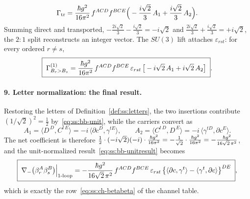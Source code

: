 \begin{equation}\label{eq:ss:bb-trsum}
\Gamma_{\mathrm{tr}}
=\frac{\hbar g^{2}}{16\pi^{2}}\,f^{ACD}f^{BCE}
\Big(-\frac{i\sqrt2}{3}\,A_1+\frac{i\sqrt2}{3}\,A_2\Big).
\end{equation}
Summing direct and transported,
$-\tfrac{2i\sqrt2}{3}-\tfrac{i\sqrt2}{3}=-i\sqrt2$ and
$\tfrac{2i\sqrt2}{3}+\tfrac{i\sqrt2}{3}=+i\sqrt2$, the $2:1$ split
reconstructs an integer vector. The $SU(3)$ lift attaches
$\varepsilon_{rst}$: for every ordered $r\ne s$,
\begin{equation}\label{eq:ss:bb-unitresult}
\boxed{\;
\Gamma^{(1)}_{B_r>B_s}
=\frac{\hbar g^{2}}{16\pi^{2}}\,f^{ACD}f^{BCE}\,\varepsilon_{rst}\,
\big[-i\sqrt2\,A_1+i\sqrt2\,A_2\big]\; } .
\end{equation}

\paragraph{9. Letter normalization: the final result.} Restoring the letters
of Definition~\ref{def:ss:letters}, the two insertions contribute
$(1/\sqrt2)^{2}=\tfrac12$ by~\eqref{eq:ss:bb-unit}, while the carriers
convert as
\begin{equation}\label{eq:ss:bb-wordconversion}
A_1=\langle D^{\,D},C^{t\,E}\rangle=-i\,\langle\partial c^{D},\gamma^{tE}\rangle,
\qquad
A_2=\langle C^{t\,D},D^{\,E}\rangle=-i\,\langle\gamma^{tD},\partial c^{E}\rangle .
\end{equation}
The net coefficient is therefore
$\tfrac12\cdot(-i\sqrt2)(-i)\cdot\tfrac{\hbar g^{2}}{16\pi^{2}}
=-\tfrac{1}{\sqrt2}\cdot\tfrac{\hbar g^{2}}{16\pi^{2}}
=-\tfrac{\hbar g^{2}}{16\sqrt2\,\pi^{2}}$, and the unit-normalized
result~\eqref{eq:ss:bb-unitresult} becomes
\begin{equation}\label{eq:ss:bb-final}
\boxed{\;
\nabla_{-}\big(\beta_{r}^{A}\beta_{s}^{B}\big)\Big|_{\mathrm{1\text{-}loop}}
=-\frac{\hbar g^{2}}{16\sqrt2\,\pi^{2}}\,f^{ACD}f^{BCE}\,\varepsilon_{rst}\,
\big\{\langle\partial c,\gamma^{t}\rangle
-\langle\gamma^{t},\partial c\rangle\big\}^{DE}\; },
\end{equation}
which is exactly the row~\eqref{eq:ss:ch-betabeta} of the channel table.

